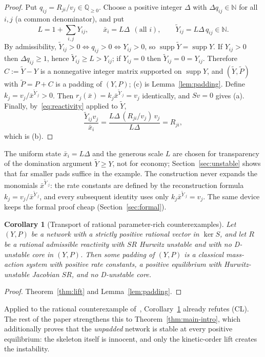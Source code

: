 \documentclass[11pt,a4paper]{article}
\theoremstyle{plain}
\newtheorem{corollary}[theorem]{Corollary}
\theoremstyle{definition}
\theoremstyle{remark}
\newcommand{\Q}{\mathbb{Q}}
\newcommand{\N}{\mathbb{N}}
\newcommand{\supp}{\operatorname{supp}}
\newcommand{\Ytil}{\widetilde{Y}}
\newcommand{\Ptil}{\widetilde{P}}
\newcommand{\xbar}{\bar{x}}
\begin{document}
\begin{proof}
Put $q_{ij}=R_{ji}/v_j\in\Q_{\ge0}$. Choose a positive integer $\Delta$ with $\Delta q_{ij}\in\N$ for all $i,j$ (a common denominator), and put
\[
  L=1+\sum_{i,j}Y_{ij},\qquad \xbar_i=L\Delta\ \ (\text{all }i),\qquad \Ytil_{ij}=L\Delta\, q_{ij}\in\N .
\]
By admissibility, $\Ytil_{ij}>0\iff q_{ij}>0\iff Y_{ij}>0$, so $\supp\Ytil=\supp Y$. If $Y_{ij}>0$ then $\Delta q_{ij}\ge1$, hence $\Ytil_{ij}\ge L>Y_{ij}$; if $Y_{ij}=0$ then $\Ytil_{ij}=0=Y_{ij}$. Therefore $C:=\Ytil-Y$ is a nonnegative integer matrix supported on $\supp Y$, and $(\Ytil,\Ptil)$ with $\Ptil=P+C$ is a padding of $(Y,P)$; (c) is Lemma~\ref{lem:padding}. Define $k_j=v_j/\xbar^{\Ytil_{\cdot j}}>0$. Then $r_j(\xbar)=k_j\xbar^{\Ytil_{\cdot j}}=v_j$ identically, and $Sv=0$ gives (a). Finally, by~\eqref{eq:reactivity} applied to $\Ytil$,
\[
  \frac{\Ytil_{ij}v_j}{\xbar_i}=\frac{L\Delta\,(R_{ji}/v_j)\,v_j}{L\Delta}=R_{ji},
\]
which is (b).
\end{proof}

The uniform state $\xbar_i=L\Delta$ and the generous scale $L$ are chosen for transparency of the domination argument $\Ytil\ge Y$, not for economy; Section~\ref{sec:unstable} shows that far smaller pads suffice in the example. The construction never expands the monomials $\xbar^{\Ytil_{\cdot j}}$: the rate constants are defined by the reconstruction formula $k_j=v_j/\xbar^{\Ytil_{\cdot j}}$, and every subsequent identity uses only $k_j\xbar^{\Ytil_{\cdot j}}=v_j$. The same device keeps the formal proof cheap (Section~\ref{sec:formal}).

\begin{corollary}[Transport of rational parameter-rich counterexamples]\label{cor:transport}
Let $(Y,P)$ be a network with a strictly positive rational vector in $\ker S$, and let $R$ be a rational admissible reactivity with $SR$ Hurwitz unstable and with no D-unstable core in $(Y,P)$. Then some padding of $(Y,P)$ is a classical mass-action system with positive rate constants, a positive equilibrium with Hurwitz-unstable Jacobian $SR$, and no D-unstable core.
\end{corollary}

\begin{proof}
Theorem~\ref{thm:lift} and Lemma~\ref{lem:padding}.
\end{proof}

Applied to the rational counterexample of~\cite{Companion2026}, Corollary~\ref{cor:transport} already refutes (CL). The rest of the paper strengthens this to Theorem~\ref{thm:main-intro}, which additionally proves that the \emph{unpadded} network is stable at every positive equilibrium: the skeleton itself is innocent, and only the kinetic-order lift creates the instability.
\end{document}
